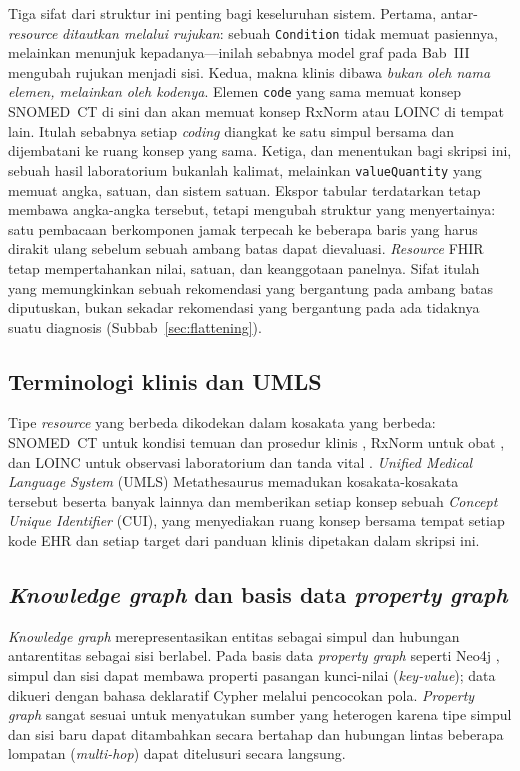 Tiga sifat dari struktur ini penting bagi keseluruhan sistem. Pertama,
antar-\emph{resource} \emph{ditautkan melalui rujukan}: sebuah \texttt{Condition} tidak
memuat pasiennya, melainkan menunjuk kepadanya---inilah sebabnya model graf pada Bab~III
mengubah rujukan menjadi sisi. Kedua, makna klinis dibawa \emph{bukan oleh nama elemen, melainkan oleh kodenya}. Elemen
\texttt{code} yang sama memuat konsep SNOMED~CT di sini dan akan memuat konsep RxNorm atau
LOINC di tempat lain. Itulah sebabnya setiap \emph{coding} diangkat ke satu simpul bersama
dan dijembatani ke ruang konsep yang sama. Ketiga, dan
menentukan bagi skripsi ini, sebuah hasil laboratorium bukanlah kalimat, melainkan
\texttt{valueQuantity} yang memuat angka, satuan, dan sistem satuan. Ekspor tabular
terdatarkan tetap membawa angka-angka tersebut, tetapi mengubah struktur yang menyertainya:
satu pembacaan berkomponen jamak terpecah ke beberapa baris yang harus dirakit ulang sebelum
sebuah ambang batas dapat dievaluasi. \emph{Resource} FHIR tetap mempertahankan nilai, satuan, dan keanggotaan panelnya. Sifat itulah yang memungkinkan sebuah rekomendasi yang bergantung pada ambang
batas diputuskan, bukan sekadar rekomendasi yang bergantung pada ada tidaknya suatu diagnosis
(Subbab~\ref{sec:flattening}).

\subsection{Terminologi klinis dan UMLS}
Tipe \emph{resource} yang berbeda dikodekan dalam kosakata yang berbeda: SNOMED~CT untuk
kondisi temuan dan prosedur klinis \cite{snomedct}, RxNorm untuk obat \cite{rxnorm}, dan LOINC untuk
observasi laboratorium dan tanda vital \cite{loinc}. \emph{Unified Medical Language System}
(UMLS) Metathesaurus \cite{umls} memadukan kosakata-kosakata tersebut beserta banyak lainnya
dan memberikan setiap konsep sebuah \emph{Concept Unique Identifier} (CUI), yang menyediakan
ruang konsep bersama tempat setiap kode EHR dan setiap target dari panduan klinis dipetakan dalam skripsi
ini.

\subsection{\emph{Knowledge graph} dan basis data \emph{property graph}}
\emph{Knowledge graph} merepresentasikan entitas sebagai simpul dan hubungan antarentitas
sebagai sisi berlabel. Pada basis data \emph{property graph} seperti Neo4j \cite{neo4j},
simpul dan sisi dapat membawa properti pasangan kunci-nilai (\emph{key-value}); data dikueri dengan bahasa
deklaratif Cypher \cite{cypher} melalui pencocokan pola. \emph{Property graph} sangat sesuai
untuk menyatukan sumber yang heterogen karena tipe simpul dan sisi baru dapat ditambahkan
secara bertahap dan hubungan lintas beberapa lompatan (\emph{multi-hop}) dapat ditelusuri secara langsung.

